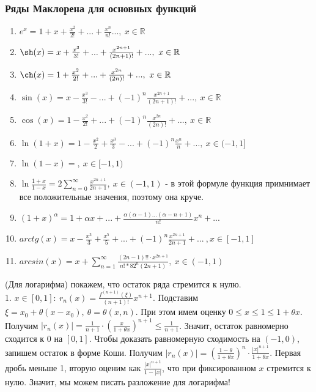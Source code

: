 \subsubsection{Ряды Маклорена для основных функций}
\begin{enumerate}
    \item $e^x=1+x+\frac{x^2}{2!}+...+\frac{x^n}{n!}...,~x\in\mathbb{R}$
\item $\sh(x)=x+\frac{x^3}{3!}+...+\frac{x^{2n+1}}{(2n+1)!}+...,~
x\in\mathbb{R}$
\item $\ch(x)=1+\frac{x^2}{2!}+...+\frac{x^{2n}}{(2n)!}+...,~x\in\mathbb{R}$
\item $\sin(x)=x-\frac{x^3}{3!}-...+(-1)^n\frac{x^{2n+1}}{(2n+1)!}+...,
    ~x\in \mathbb{R}$
\item $\cos(x)=1-\frac{x^2}{2!}+...+(-1)^n \frac{x^{2n}}{(2n)!}+...,~
    x\in\mathbb{R}$ 
\item $\ln(1+x)=1-\frac{x^2}{2}+\frac{x^3}{3}-...+(-1)^n
    \frac{x^n}{n}+...,~x\in(-1,1]$
\item $\ln(1-x)=,~x\in[-1,1)$
\item $\ln \frac{1+x}{1-x}=2 \sum\limits_{n=0}^{\infty} \frac{x^{2n+1}}
    {2n+1},~ x\in(-1,1)$ - в этой формуле функция примнимает все положительные
значения, поэтому она круче. 
\item $(1+x)^\alpha=1+\alpha x+...+\frac{\alpha(\alpha-1)...(\alpha-n+1)}
    {n!}x^n+...$
\item $arctg(x)=x-\frac{x^3}{3}+\frac{x^5}{5}+...+(-1)^n \frac{x^{2n+1}}
    {2n+1}+...~,x\in[-1,1]$
\item $arcsin(x)=x+\sum\limits_{n=1}^{\infty} \frac{(2n-1)!!\cdot x^{2n+1}}
    {n!*82^n(2n+1)},~x\in(-1,1)$


\end{enumerate}
(Для логарифма) покажем, что остаток ряда стремится к нулю.\\
1. $x\in[0,1]:~r_n(x)=\frac{f^{(n+1)}(\xi)}{(n+1)!}x^{n+1}$. 
Подставим $\xi=x_0+\theta(x-x_0),~\theta=\theta(x,n)$.
При этом имем оценку $0\leqslant x\leqslant 1\leqslant 1+\theta x$.
Получим
$|r_n(x)|=\frac{1}{n+1}\cdot \left( \frac{x}{1+\theta x} \right)^{n+1}
\leqslant \frac{1}{n+1}$. Значит, остаток равномерно сходится к 0 на $[0,1]$.
Чтобы доказать равномерную сходимость на  $(-1,0)$, запишем остаток в 
форме Коши. Получим  $|r_n(x)|=\left( \frac{1-\theta}{1+\theta x} \right)^n
\cdot \frac{|x|^{n+1}}{1+\theta x}$. Первая дробь меньше 1, вторую 
оценим как $\frac{|x|^{n+1}}{1-{|x|}}$, что при фиксированном $x$ стремится 
к нулю.
Значит, мы можем писать разложение для логарифма!\\
